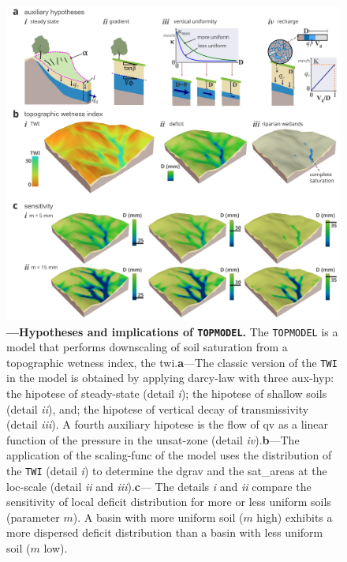 \documentclass[./main_en.tex]{subfiles}
\begin{document}
\begin{figure}[t!] 
\centering				
\includegraphics[width=0.98\linewidth]{figs/fig_topmodel_en.jpg}		
\caption[Hypotheses and implications of \texttt{TOPMODEL}]
{\textbf{---\;Hypotheses and implications of \texttt{TOPMODEL}.}
    The \texttt{TOPMODEL} is a \gls{model} that performs \gls{downscaling} of soil saturation from a topographic wetness index, the \gls{twi}.\;\textbf{a}\;---\;The classic version of the \texttt{TWI} in the \gls{model} is obtained by applying \gls{darcy-law} with three \gls{aux-hyp}: the \gls{hipotese} of steady-state (detail \textrm{\textit{i}}); the \gls{hipotese} of shallow soils (detail \textrm{\textit{ii}}), and; the \gls{hipotese} of vertical decay of transmissivity (detail \textrm{\textit{iii}}). A fourth auxiliary \gls{hipotese} is the flow of \gls{qv} as a linear function of the pressure in the \gls{unsat-zone} (detail \textrm{\textit{iv}}).\;\textbf{b}\;---\;The application of the \gls{scaling-func} of the \gls{model} uses the distribution of the \texttt{TWI} (detail \textrm{\textit{i}}) to determine the \gls{dgrav} and the \gls{sat_areas} at the \gls{loc-scale} (detail \textrm{\textit{ii}} and \textrm{\textit{iii}}).\;\textbf{c}\;---\; The details \textrm{\textit{i}} and \textrm{\textit{ii}} compare the sensitivity of local deficit distribution for more or less uniform soils (parameter $m$). A basin with more uniform soil ($m$ high) exhibits a more dispersed deficit distribution than a basin with less uniform soil ($m$ low). 
}
\label{fig:hydro:topmodel} 		
\end{figure}
\end{document}
